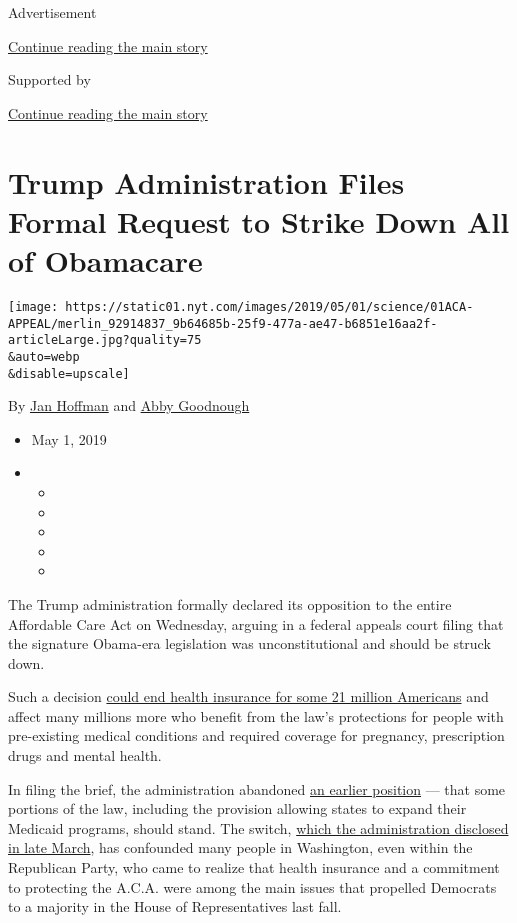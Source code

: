 Advertisement

\protect\hyperlink{after-top}{Continue reading the main story}

Supported by

\protect\hyperlink{after-sponsor}{Continue reading the main story}

\hypertarget{trump-administration-files-formal-request-to-strike-down-all-of-obamacare}{%
\section{Trump Administration Files Formal Request to Strike Down All of
Obamacare}\label{trump-administration-files-formal-request-to-strike-down-all-of-obamacare}}

\texttt{[image: https://static01.nyt.com/images/2019/05/01/science/01ACA-APPEAL/merlin\_92914837\_9b64685b-25f9-477a-ae47-b6851e16aa2f-articleLarge.jpg?quality=75\\\&auto=webp\\\&disable=upscale]}

By \href{https://www.nytimes.com/by/jan-hoffman}{Jan Hoffman} and
\href{https://www.nytimes.com/by/abby-goodnough}{Abby Goodnough}

\begin{itemize}
\item
  May 1, 2019
\item
  \begin{itemize}
  \item
  \item
  \item
  \item
  \item
  \end{itemize}
\end{itemize}

The Trump administration formally declared its opposition to the entire
Affordable Care Act on Wednesday, arguing in a federal appeals court
filing that the signature Obama-era legislation was unconstitutional and
should be struck down.

Such a decision
\href{https://www.nytimes.com/2019/03/26/health/obamacare-trump-health.html}{could
end health insurance for some 21 million Americans} and affect many
millions more who benefit from the law's protections for people with
pre-existing medical conditions and required coverage for pregnancy,
prescription drugs and mental health.

In filing the brief, the administration abandoned
\href{https://www.nytimes.com/2018/06/07/us/politics/trump-affordable-care-act.html?searchResultPosition=2}{an
earlier position} --- that some portions of the law, including the
provision allowing states to expand their Medicaid programs, should
stand. The switch,
\href{https://www.nytimes.com/2019/03/25/us/politics/obamacare-unconstitutional-trump-aca.html}{which
the administration disclosed in late March}, has confounded many people
in Washington, even within the Republican Party, who came to realize
that health insurance and a commitment to protecting the A.C.A. were
among the main issues that propelled Democrats to a majority in the
House of Representatives last fall.

